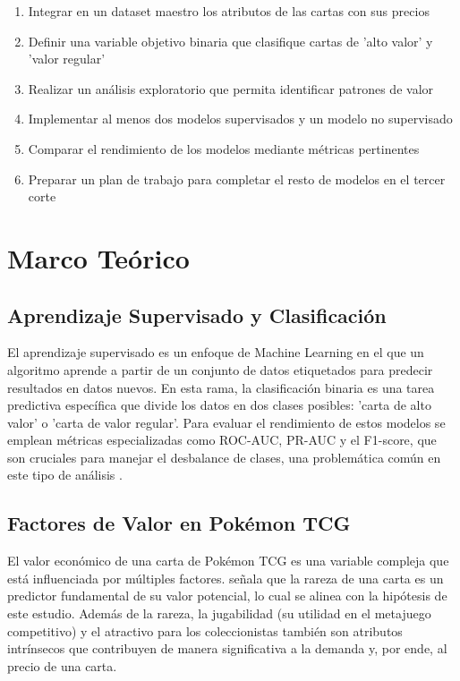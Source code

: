\documentclass[12pt,letterpaper]{article}
\begin{document}
\begin{enumerate}
    \item Integrar en un dataset maestro los atributos de las cartas con sus precios
    \item Definir una variable objetivo binaria que clasifique cartas de 'alto valor' y 'valor regular'
    \item Realizar un análisis exploratorio que permita identificar patrones de valor
    \item Implementar al menos dos modelos supervisados y un modelo no supervisado
    \item Comparar el rendimiento de los modelos mediante métricas pertinentes
    \item Preparar un plan de trabajo para completar el resto de modelos en el tercer corte
\end{enumerate}

\section{Marco Teórico}

\subsection{Aprendizaje Supervisado y Clasificación}

El aprendizaje supervisado es un enfoque de Machine Learning en el que un algoritmo aprende a partir de un conjunto de datos etiquetados para predecir resultados en datos nuevos. En esta rama, la clasificación binaria es una tarea predictiva específica que divide los datos en dos clases posibles: 'carta de alto valor' o 'carta de valor regular'. Para evaluar el rendimiento de estos modelos se emplean métricas especializadas como ROC-AUC, PR-AUC y el F1-score, que son cruciales para manejar el desbalance de clases, una problemática común en este tipo de análisis \cite{geron2022}.

\subsection{Factores de Valor en Pokémon TCG}

El valor económico de una carta de Pokémon TCG es una variable compleja que está influenciada por múltiples factores.  señala que la rareza de una carta es un predictor fundamental de su valor potencial, lo cual se alinea con la hipótesis de este estudio. Además de la rareza, la jugabilidad (su utilidad en el metajuego competitivo) y el atractivo para los coleccionistas también son atributos intrínsecos que contribuyen de manera significativa a la demanda y, por ende, al precio de una carta.
\end{document}
